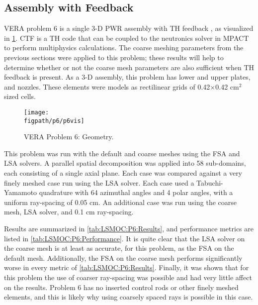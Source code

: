 {{    \subsection{Assembly with Feedback}{\label{ssec:LSMOC:Assembly with Feedback}
      \ac{VERA} problem 6 is a single 3-D \ac{PWR} assembly with \ac{TH} feedback \cite{VERAProblems}, as visualized in \cref{fig:LSMOC:P6:Problem}.
      \acf{CTF} \cite{CTF} is a \ac{TH} code that can be coupled to the neutronics solver in MPACT to perform multiphysics calculations.
      The coarse meshing parameters from the previous sections were applied to this problem;
        these results will help to determine whether or not the coarse mesh parameters are also sufficient when \ac{TH} feedback is present.
      As a 3-D assembly, this problem has lower and upper plates, and nozzles.
      These elements were models as rectilinear grids of 0.42$\times$0.42 cm$^2$ sized cells.

      \begin{figure}[h]
        \centering
        \texttt{[image: \\figpath/p6/p6vis]}
        \caption{VERA Problem 6: Geometry.\label{fig:LSMOC:P6:Problem}}
      \end{figure}

      This problem was run with the default and coarse meshes using the \ac{FSA} and \ac{LSA} solvers.
      A parallel spatial decomposition was applied into 58 sub-domains, each consisting of a single axial plane.
      Each case was compared against a very finely meshed case run using the \ac{LSA} solver.
      Each case used a Tabuchi-Yamamoto quadrature with 64 azimuthal angles and 4 polar angles, with a uniform ray-spacing of 0.05 cm.
      An additional case was run using the coarse mesh, \ac{LSA} solver, and 0.1 cm ray-spacing.

      Results are summarized in \cref{tab:LSMOC:P6:Results}, and performance metrics are listed in \cref{tab:LSMOC:P6:Performance}.
      It is quite clear that the \ac{LSA} solver on the coarse mesh is at least as accurate, for this problem, as the \ac{FSA} on the default mesh.
      Additionally, the \ac{FSA} on the coarse mesh performs significantly worse in every metric of \cref{tab:LSMOC:P6:Results}.
      Finally, it was shown that for this problem the use of coarser ray-spacing was possible and had very little affect on the results.
      Problem 6 has no inserted control rods or other finely meshed elements, and this is likely why using coarsely spaced rays is possible in this case.

}}}
